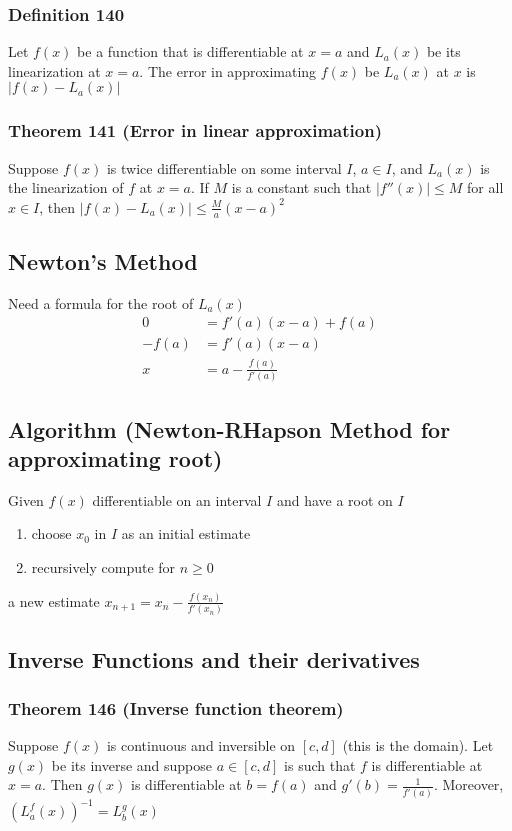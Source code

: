 \documentclass[12pt, letterpaper]{article}
\begin{document}
\subsubsection*{Definition 140}
Let $f(x)$ be a function that is differentiable at $x=a$ and $L_a(x)$ be its linearization at $x=a$. The error in approximating
$f(x)$ be $L_a(x)$ at $x$ is $|f(x) - L_a(x)|$
\subsubsection*{Theorem 141 (Error in linear approximation)}
Suppose $f(x)$ is twice differentiable on some interval $I$, $a\in I$, and $L_a(x)$ is the linearization of $f$ at $x=a$. If $M$ is a constant such that 
$|f''(x)| \leq M$ for all $x\in I$, then $|f(x) - L_a(x)|\leq \frac{M}{a}(x-a)^2$
\subsection{Newton's Method}
Need a formula for the root of $L_a(x)$
\begin{align*}
    0 &= f'(a)(x-a) + f(a) \\
    -f(a) &= f'(a)(x-a) \\
    x &= a - \frac{f(a)}{f'(a)}
\end{align*}
\subsection{Algorithm (Newton-RHapson Method for approximating root)}
Given $f(x)$ differentiable on an interval $I$ and have a root on $I$
\begin{enumerate}
    \item choose $x_0$ in $I$ as an initial estimate
    \item recursively compute for $n\geq 0$
\end{enumerate}
a new estimate $x_{n+1} = x_n - \frac{f(x_n)}{f'(x_n)}$
\subsection{Inverse Functions and their derivatives}
\subsubsection*{Theorem 146 (Inverse function theorem)}
Suppose $f(x)$ is continuous and inversible on $[c,d]$ (this is the domain). Let $g(x)$ be its inverse and suppose $a\in[c,d]$ is such that
$f$ is differentiable at $x=a$. Then $g(x)$ is differentiable at $b=f(a)$ and $g'(b) = \frac{1}{f'(a)}$. Moreover, 
$(L^f_a(x))^{-1} = L^g_b(x)$
\end{document}
